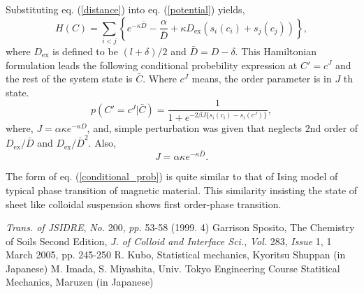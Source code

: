 \documentclass{article}
\begin{document}
Substituting eq. (\ref{distance}) into eq. (\ref{potential}) yields,
\begin{equation}
 H (C) = \sum_{i<j} \left\{e^{-\kappa \bar{D}} - \frac{\alpha}{\bar{D}} + \kappa D_{\text{ex}}\left(s_i(c_i) + s_j(c_j)\right)\right\},
\end{equation}
where $D_{\text{ex}}$ is defined to be $(l + \delta) / 2$ and $\bar{D} = D - \delta$.
This Hamiltonian formulation leads the following conditional probebility expression at $C' = c^J$ and the rest of the system state is $\bar{C}$. 
Where $c^J$ means, the order parameter is in $J$ th state.
\begin{equation}
 p(C'=c^J|\bar{C}) = \frac{1}{1 + e^{-2\beta J \{s_i (c_i) - s_i (c^J)\}}},  \label{conditional_prob}
\end{equation}
where, $J = \alpha \kappa e^{-\kappa D}$, and, simple perturbation was given that neglects 2nd order of $D_{\text{ex}}/\bar{D}$ and $D_{\text{ex}} / \bar{D}^2$.
Also, 
\begin{equation}
 J = \alpha \kappa e^{-\kappa \bar{D}}.
\end{equation}

The form of eq. (\ref{conditional_prob}) is quite similar to that of Ising model of typical phase transition of magnetic material.
This similarity insisting the state of sheet like colloidal suspension shows first order-phase transition.





\begin{thebibliography}{99}
   \textit{Trans. of JSIDRE}, \textit{No.} 200, \textit{pp.} 53-58 (1999. 4)
  Garrison Sposito, The Chemistry of Soils Second Edition, 
  \textit{J. of Colloid and Interface Sci.}, \textit{Vol.} 283, \textit{Issue} 1, 1 March 2005, pp. 245-250
     R. Kubo, Statistical mechanics, Kyoritsu Shuppan (in Japanese)
  M. Imada, S. Miyashita, Univ. Tokyo Engineering Course Statitical Mechanics, Maruzen (in Japanese)
\end{thebibliography}
\end{document}
